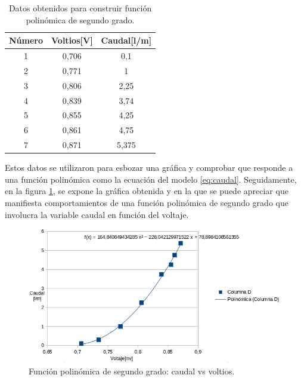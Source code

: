 \begin{table}[htpb]
	\centering
	\caption{Datos obtenidos para construir función polinómica de segundo grado.}
	\begin{tabular}{c c c }    
		\toprule
		\textbf{Número}   & \textbf{Voltios[V]} & \textbf{Caudal[l/m]}  \\
		\midrule
		1  & 0,706 & 0,1 \\
		2  & 0,771 & 1 \\
		3  & 0,806 & 2,25\\
		4  & 0,839 & 3,74 \\
		5  & 0,855 & 4,25  \\
		6  & 0,861 & 4,75 \\
		7  & 0,871 & 5,375 \\

		\bottomrule
		\hline
	\end{tabular}
	\label{tab:datos obtenidos para construir función polinómica de segundo grado.}
\end{table}
Estos datos se utilizaron para esbozar una gráfica y comprobar que responde a una función polinómica como la ecuación del modelo \ref{eq:caudal}. Seguidamente, en la figura \ref{fig:Función polinomica de segundo grado: caudal vs voltios}, se expone la gráfica obtenida y en la que se puede apreciar que manifiesta comportamientos de una función polinómica de segundo grado que involucra la variable caudal en función del voltaje.
 

\begin{figure}[H]
	\centering
	\includegraphics[scale=.65]{./Figures/FuncionPolinomica-Caudal.png}
	\caption{Función polinómica de segundo grado: caudal vs voltios.}
\label{fig:Función polinomica de segundo grado: caudal vs voltios}
\end{figure}



